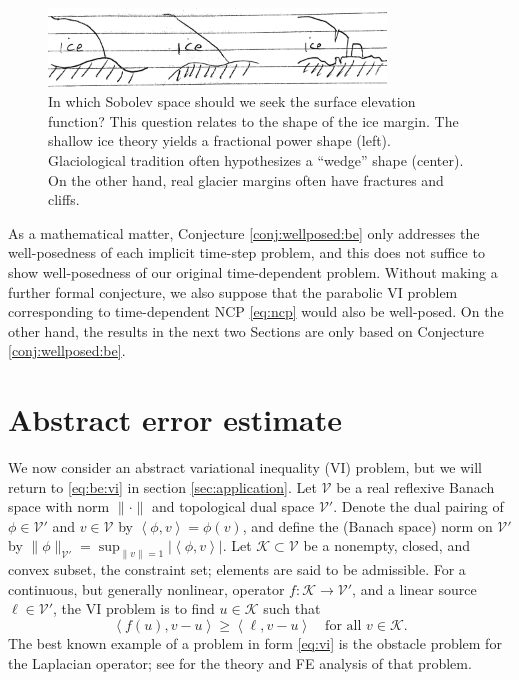 \documentclass[hidelinks,onefignum,onetabnum,final]{siamart220329}  %
\newcommand{\cK}{\mathcal{K}}
\newcommand{\cV}{\mathcal{V}}
\newcommand{\ip}[2]{\left<#1,#2\right>}
\begin{document}
\begin{figure}
\begin{center}
\includegraphics[width=0.8\textwidth]{figs/margins.jpg}
\end{center}
\caption{In which Sobolev space should we seek the surface elevation function?  This question relates to the shape of the ice margin.  The shallow ice theory yields a fractional power shape (left).  Glaciological tradition often hypothesizes a ``wedge'' shape (center).  On the other hand, real glacier margins often have fractures and cliffs.} %
\label{fig:margins}
\end{figure}

As a mathematical matter, Conjecture \ref{conj:wellposed:be} only addresses the well-posedness of each implicit time-step problem, and this does not suffice to show well-posedness of our original time-dependent problem.  Without making a further formal conjecture, we also suppose that the parabolic VI problem corresponding to time-dependent NCP \eqref{eq:ncp} would also be well-posed.  On the other hand, the results in the next two Sections are only based on Conjecture \ref{conj:wellposed:be}.


\section{Abstract error estimate} \label{sec:abstractestimate}

We now consider an abstract variational inequality (VI) \cite{KinderlehrerStampacchia1980} problem, but we will return to \eqref{eq:be:vi} in section \ref{sec:application}.  Let $\cV$ be a real reflexive Banach space with norm $\|\cdot\|$ and topological dual space $\cV'$.  Denote the dual pairing of $\phi \in \cV'$ and $v\in\cV$ by $\ip{\phi}{v} = \phi(v)$, and define the (Banach space) norm on $\cV'$ by $\|\phi\|_{\cV'} = \sup_{\|v\|=1} |\!\ip{\phi}{v}\!|$.  Let $\cK \subset \cV$ be a nonempty, closed, and convex subset, the constraint set; elements are said to be admissible.  For a continuous, but generally nonlinear, operator $f:\cK \to \cV'$, and a linear source $\ell\in \cV'$, the VI problem is to find $u\in \cK$ such that
\begin{equation}
\ip{f(u)}{v-u} \ge \ip{\ell}{v-u} \quad \text{for all } v\in \cK. \label{eq:vi}
\end{equation}
The best known example of a problem in form \eqref{eq:vi} is the obstacle problem for the Laplacian operator; see \cite{Ciarlet2002,Evans2010,KinderlehrerStampacchia1980} for the theory and FE analysis of that problem.
\end{document}
